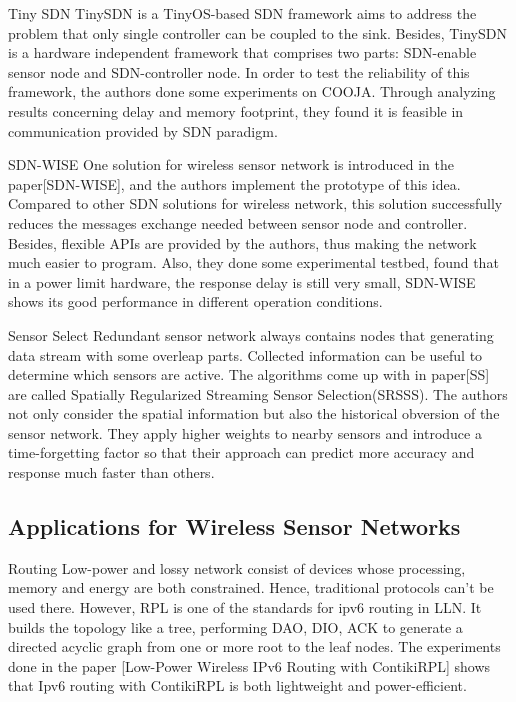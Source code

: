 Tiny SDN
	TinySDN is a TinyOS-based SDN framework aims to address the problem that only single controller can be coupled to the sink. Besides, TinySDN is a hardware independent framework that comprises two parts: SDN-enable sensor node and SDN-controller node. In order to test the reliability of this framework, the authors done some experiments on COOJA. Through analyzing results concerning delay and memory footprint, they found it is feasible in communication provided by SDN paradigm.

SDN-WISE
	One solution for wireless sensor network is introduced in the paper[SDN-WISE], and the authors implement the prototype of this idea. Compared to other SDN solutions for wireless network, this solution successfully reduces the messages exchange needed between sensor node and controller. Besides, flexible APIs are provided by the authors, thus making the network much easier to program. Also, they done some experimental testbed, found that in a power limit hardware, the response delay is still very small, SDN-WISE shows its good performance in different operation conditions.

Sensor Select
	Redundant sensor network always contains nodes that generating data stream with some overleap parts. Collected information can be useful to determine which sensors are active. The algorithms come up with in paper[SS] are called Spatially Regularized Streaming Sensor Selection(SRSSS). The authors not only consider the spatial information but also the historical obversion of the sensor network. They apply higher weights to nearby sensors and introduce a time-forgetting factor so that their approach can predict more accuracy and response much faster than others.




\subsection{Applications for Wireless Sensor Networks}

Routing
Low-power and lossy network consist of devices whose processing, memory and energy are both constrained. Hence, traditional protocols can’t be used there. However, RPL is one of the standards for ipv6 routing in LLN. It builds the topology like a tree, performing DAO, DIO, ACK to generate a directed acyclic graph from one or more root to the leaf nodes. The experiments done in the paper [Low-Power Wireless IPv6 Routing with ContikiRPL] shows that Ipv6 routing with ContikiRPL is both lightweight and power-efficient.
 

